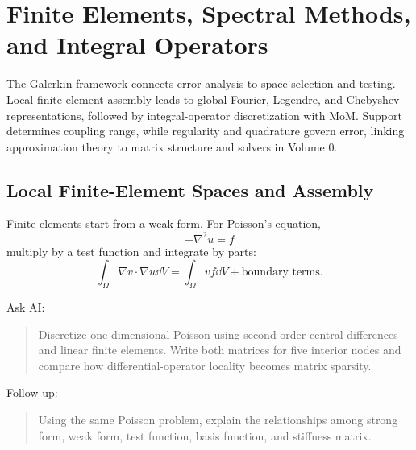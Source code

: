 \chapter{Finite Elements, Spectral Methods, and Integral Operators}\label{ch:9}
\begin{chaptersummary}
The Galerkin framework connects error analysis to space selection and testing. Local finite-element assembly leads to global Fourier, Legendre, and Chebyshev representations, followed by integral-operator discretization with MoM. Support determines coupling range, while regularity and quadrature govern error, linking approximation theory to matrix structure and solvers in Volume 0.
\end{chaptersummary}
\section{Local Finite-Element Spaces and Assembly}
Finite elements start from a weak form. For Poisson's equation,
\[
-\nabla^2u=f
\]
multiply by a test function and integrate by parts:
\[
\int_\Omega\nabla v\cdot\nabla u\dd V
=
\int_\Omega vf\dd V+\text{boundary terms}.
\]

\begin{askai}
Ask AI:
\begin{quote}
Discretize one-dimensional Poisson using second-order central differences and linear finite elements. Write both matrices for five interior nodes and compare how differential-operator locality becomes matrix sparsity.
\end{quote}

Follow-up:
\begin{quote}
Using the same Poisson problem, explain the relationships among strong form, weak form, test function, basis function, and stiffness matrix.
\end{quote}
\end{askai}

